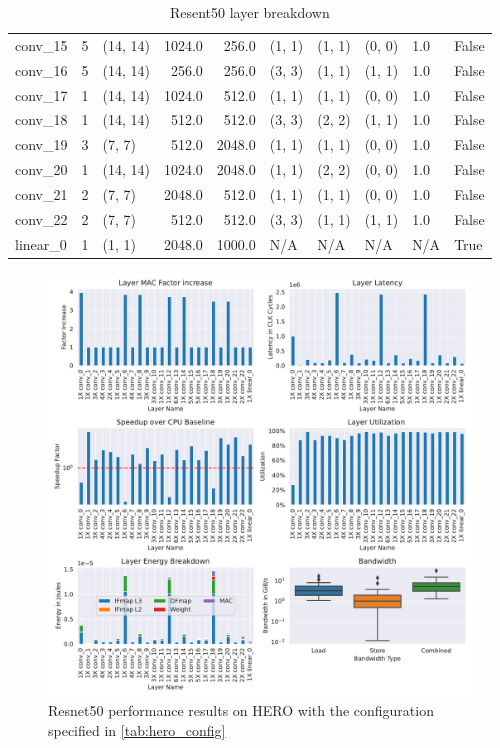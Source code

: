 \begin{center}
\begin{table}[]
\begin{tabular}{lrlrrlllll}
        conv\_15  & 5 &    (14, 14) &  1024.0 &   256.0 &  (1, 1) &  (1, 1) &  (0, 0) &    1.0 &  False \\
        conv\_16  & 5 &    (14, 14) &   256.0 &   256.0 &  (3, 3) &  (1, 1) &  (1, 1) &    1.0 &  False \\
        conv\_17  & 1 &    (14, 14) &  1024.0 &   512.0 &  (1, 1) &  (1, 1) &  (0, 0) &    1.0 &  False \\
        conv\_18  & 1 &    (14, 14) &   512.0 &   512.0 &  (3, 3) &  (2, 2) &  (1, 1) &    1.0 &  False \\
        conv\_19  & 3 &      (7, 7) &   512.0 &  2048.0 &  (1, 1) &  (1, 1) &  (0, 0) &    1.0 &  False \\
        conv\_20  & 1 &    (14, 14) &  1024.0 &  2048.0 &  (1, 1) &  (2, 2) &  (0, 0) &    1.0 &  False \\
        conv\_21  & 2 &      (7, 7) &  2048.0 &   512.0 &  (1, 1) &  (1, 1) &  (0, 0) &    1.0 &  False \\
        conv\_22  & 2 &      (7, 7) &   512.0 &   512.0 &  (3, 3) &  (1, 1) &  (1, 1) &    1.0 &  False \\
        linear\_0 & 1 &      (1, 1) &  2048.0 &  1000.0 &     N/A &     N/A &     N/A &    N/A &   True \\
        \bottomrule
        \end{tabular}
        \caption{Resent50 layer breakdown}
        \label{tab:resnet50_layer_breakdown}
\end{table}
\end{center}

\begin{figure}[ht]
    \centering
    \includegraphics[scale=0.5]{Plots/networks/resnet50.pdf}
    \caption{Resnet50 performance results on HERO with the configuration specified in \autoref{tab:hero_config}}
    \label{fig:resnet50_metrics}
\end{figure}


